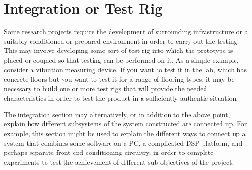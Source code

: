 \section{Integration or Test Rig}

Some research projects require the development of surrounding infrastructure or a suitably conditioned or prepared environment in order to carry out the testing. This may involve developing some sort of test rig into which the prototype is placed or coupled so that testing can be performed on it. As a simple example, consider a vibration measuring device. If you want to test it in the lab, which has concrete floors but you want to test it for a range of flooring types, it may be necessary to build one or more test rigs that will provide the needed characteristics in order to test the product in a sufficiently authentic situation.

The integration section may alternatively, or in addition to the above point, explain how different subsystems of the system constructed are connected up. For example, this section might be used to explain the different ways to connect up a system that combines some software on a PC, a complicated DSP platform, and perhaps separate front-end conditioning circuitry, in order to complete experiments to test the achievement of different sub-objectives of the project.
